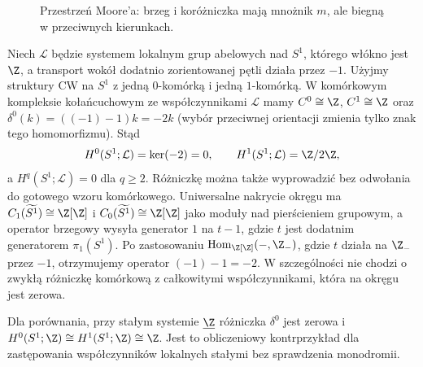 \begin{figure}[!htbp]
\centering
{}
\caption{Przestrzeń Moore'a: brzeg i koróżniczka mają
mnożnik $m$, ale biegną w przeciwnych kierunkach.}
\label{fig:moore-kernel-cokernel-v6}
\end{figure}

\begin{przyklad}
Niech $\mathcal L$ będzie systemem lokalnym grup abelowych nad
$S^1$, którego włókno jest $\Z$, a transport wokół dodatnio
zorientowanej pętli działa przez $-1$. Użyjmy struktury CW na
$S^1$ z jedną $0$-komórką i jedną $1$-komórką. W komórkowym
kompleksie kołańcuchowym ze współczynnikami $\mathcal L$
mamy $C^0\cong\Z$, $C^1\cong\Z$ oraz
$\delta^0(k)=((-1)-1)k=-2k$ (wybór przeciwnej orientacji
zmienia tylko znak tego homomorfizmu). Stąd
\[
H^0(S^1;\mathcal L)=\ker(-2)=0,\qquad
H^1(S^1;\mathcal L)=\Z/2\Z,
\]
a $H^q(S^1;\mathcal L)=0$ dla $q\ge2$.
Różniczkę można także wyprowadzić bez odwołania do gotowego
wzoru komórkowego. Uniwersalne nakrycie okręgu ma
$C_1(\widetilde{S^1})\cong\Z[\Z]$ i
$C_0(\widetilde{S^1})\cong\Z[\Z]$ jako moduły nad
pierścieniem grupowym, a operator brzegowy wysyła generator
$1$ na $t-1$, gdzie $t$ jest dodatnim generatorem
$\pi_1(S^1)$. Po zastosowaniu
$\operatorname{Hom}_{\Z[\Z]}(-,\Z_{-})$,
gdzie $t$ działa na $\Z_{-}$ przez $-1$,
otrzymujemy operator $(-1)-1=-2$. W szczególności
nie chodzi o zwykłą różniczkę komórkową z całkowitymi
współczynnikami, która na okręgu jest zerowa.

Dla porównania, przy stałym systemie $\underline\Z$ różniczka
$\delta^0$ jest zerowa i $H^0(S^1;\Z)\cong
H^1(S^1;\Z)\cong\Z$. Jest to obliczeniowy
kontrprzykład dla zastępowania współczynników lokalnych
stałymi bez sprawdzenia monodromii.
\end{przyklad}

